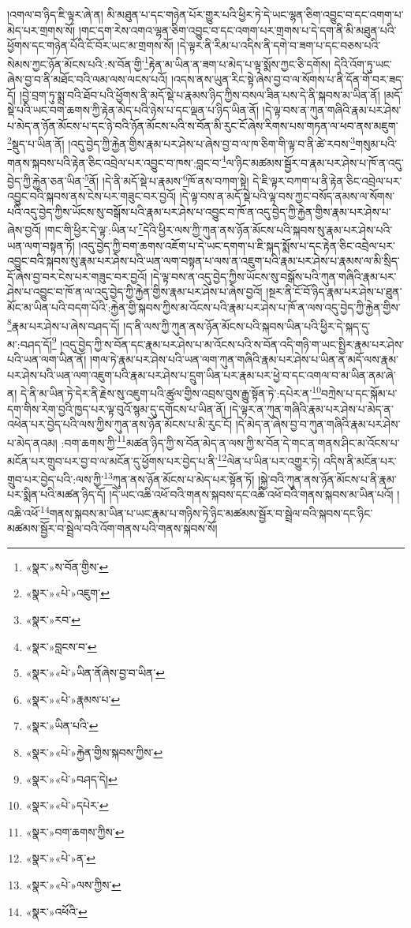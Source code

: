 །འགལ་བ་ཉིད་ཇི་ལྟར་ཞེ་ན། མི་མཐུན་པ་དང་གཉེན་པོར་གྱུར་པའི་ཕྱིར་ཏེ་དེ་ཡང་ལྷན་ཅིག་འབྱུང་བ་དང་འགག་པ་མེད་པར་གྲགས་སོ། །གང་དག་རེས་འགའ་ལྷན་ཅིག་འབྱུང་བ་དང་འགག་པར་གྲགས་པ་དེ་དག་ནི་མི་མཐུན་པའི་ཕྱོགས་དང་གཉེན་པོའི་ངོ་བོར་ཡང་མ་གྲགས་སོ། །དེ་ལྟར་ནི་རིམ་པ་འདིས་ནི་དགེ་བ་ཟག་པ་དང་བཅས་པའི་སེམས་ཀྱང་ཉོན་མོངས་པའི་:ས་བོན་གྱི་\footnote{«སྣར་»ས་བོན་གྱིས་}རྟེན་མ་ཡིན་ན་ཟག་པ་མེད་པ་ལྟ་སྨོས་ཀྱང་ཅི་དགོས། དེའི་འོག་ཏུ་ཡང་ཞེས་བྱ་བ་ནི་མཐོང་བའི་ལམ་ལས་ལངས་པའོ། །འདས་ནས་ཡུན་རིང་སྟེ་ཞེས་བྱ་བ་ལ་སོགས་པ་ནི་དོན་གོ་བར་ཟད་དོ། །བྱེ་བྲག་ཏུ་སྨྲ་བའི་ཐོབ་པའི་ཕྱོགས་ནི་མདོ་སྡེ་པ་རྣམས་ཉིད་ཀྱིས་བསལ་ཟིན་པས་དེ་ནི་སྐབས་མ་ཡིན་ནོ། །མདོ་སྡེ་པའི་ཡང་བག་ཆགས་ཀྱི་རྟེན་མེད་པའི་ཉེས་པ་དང་ལྡན་པ་ཉིད་ཡིན་ནོ། །དེ་ལྟ་བས་ན་ཀུན་གཞིའི་རྣམ་པར་ཤེས་པ་མེད་ན་ཉོན་མོངས་པ་དང་ཉེ་བའི་ཉོན་མོངས་པའི་ས་བོན་མི་རུང་ངོ་ཞེས་རིགས་པས་གཏན་ལ་ཕབ་ནས་མཇུག་\footnote{«སྣར་»«པེ་»འཇུག་}སྡུད་པ་ཡིན་ནོ། །འདུ་བྱེད་ཀྱི་རྐྱེན་གྱིས་རྣམ་པར་ཤེས་པ་ཞེས་བྱ་བ་ལ་ཁ་ཅིག་གི་ལྟ་བ་ནི་ཚེ་རབས་\footnote{«སྣར་»རབ་}གསུམ་པའི་གནས་སྐབས་པའི་རྟེན་ཅིང་འབྲེལ་པར་འབྱུང་བ་ཁས་:བླང་བ་\footnote{«སྣར་»བླངས་བ་}ལ་ཉིང་མཚམས་སྦྱོར་བ་རྣམ་པར་ཤེས་པ་ཁོ་ན་འདུ་བྱེད་ཀྱི་རྐྱེན་ཅན་ཡིན་\footnote{«སྣར་»«པེ་»ཡིན་ནོཞེས་བྱ་བ་ཡིན་}ནོ། །དེ་ནི་མདོ་སྡེ་པ་རྣམས་\footnote{«སྣར་»«པེ་»རྣམས་པ་}ཁོ་ནས་བཀག་སྟེ། དེ་ཇི་ལྟར་བཀག་པ་ནི་རྟེན་ཅིང་འབྲེལ་པར་འབྱུང་བའི་སྐབས་ནས་ངེས་པར་གཟུང་བར་བྱའོ། །དེ་ལྟ་བས་ན་མདོ་སྡེ་པའི་ལྟ་བས་ཀྱང་བསོད་ནམས་ལ་སོགས་པའི་འདུ་བྱེད་ཀྱིས་ཡོངས་སུ་བསྒོས་པའི་རྣམ་པར་ཤེས་པ་འབྱུང་བ་ཁོ་ན་འདུ་བྱེད་ཀྱི་རྐྱེན་གྱིས་རྣམ་པར་ཤེས་པ་ཞེས་བྱའོ། །གང་གི་ཕྱིར་དེ་ལྟ་:ཡིན་པ་\footnote{«སྣར་»ཡིན་པའི་}དེའི་ཕྱིར་ལས་ཀྱི་ཀུན་ནས་ཉོན་མོངས་པའི་སྐབས་སུ་རྣམ་པར་ཤེས་པའི་ཡན་ལག་བསྟན་ཏོ། །འདུ་བྱེད་ཀྱི་བག་ཆགས་འཇོག་པ་དེ་ཡང་དགག་པ་ཇི་སྐད་སྨོས་པ་དང་རྟེན་ཅིང་འབྲེལ་པར་འབྱུང་བའི་སྐབས་སུ་རྣམ་པར་ཤེས་པའི་ཡན་ལག་བསྟན་པ་ལས་ན་འཇུག་པའི་རྣམ་པར་ཤེས་པ་རྣམས་ལ་མི་སྲིད་དོ་ཞེས་བྱ་བར་ངེས་པར་གཟུང་བར་བྱའོ། །དེ་ལྟ་བས་ན་འདུ་བྱེད་ཀྱིས་ཡོངས་སུ་བསྒོས་པའི་ཀུན་གཞིའི་རྣམ་པར་ཤེས་པ་འབྱུང་བ་ཁོ་ན་ལ་འདུ་བྱེད་ཀྱི་རྐྱེན་གྱིས་རྣམ་པར་ཤེས་པ་ཞེས་བྱའོ། །སྔར་ནི་ངོ་བོ་ཉིད་རྣམ་པར་ཤེས་པ་ཐུན་མོང་མ་ཡིན་པའི་བདག་པོའི་:རྐྱེན་གྱི་སྐབས་ཀྱིས་མ་འོངས་པའི་རྣམ་པར་ཤེས་པ་ཁོ་ན་ལས་འདུ་བྱེད་ཀྱི་རྐྱེན་གྱིས་\footnote{«སྣར་»«པེ་»རྐྱེན་གྱིས་སྐབས་ཀྱིས་}རྣམ་པར་ཤེས་པ་ཞེས་བཤད་དོ། །ད་ནི་ལས་ཀྱི་ཀུན་ནས་ཉོན་མོངས་པའི་སྐབས་ཡིན་པའི་ཕྱིར་དེ་སྐད་དུ་མ་:བཤད་དོ།\footnote{«སྣར་»«པེ་»བཤད་དེ།} །འདུ་བྱེད་ཀྱི་ས་བོན་དང་རྣམ་པར་ཤེས་པ་མ་འོངས་པའི་ས་བོན་འདི་གཉི་ག་ཡང་སྤྱིར་རྣམ་པར་ཤེས་པའི་ཡན་ལག་ཡིན་ནོ། །གལ་ཏེ་རྣམ་པར་ཤེས་པའི་ཡན་ལག་ཀུན་གཞིའི་རྣམ་པར་ཤེས་པ་ཡིན་ན་མདོ་ལས་རྣམ་པར་ཤེས་པའི་ཡན་ལག་འཇུག་པའི་རྣམ་པར་ཤེས་པ་དྲུག་ཡིན་པར་རྣམ་པར་ཕྱེ་བ་དང་འགལ་བ་མ་ཡིན་ནམ་ཞེ་ན། དེ་ནི་མ་ཡིན་ཏེ་དེར་ནི་རྗེས་སུ་འཇུག་པའི་ཚུལ་གྱིས་འབྲས་བུས་རྒྱུ་སྟོན་ཏེ་:དཔེར་ན་\footnote{«སྣར་»«པེ་»དཔེར་}བཀྲེས་པ་དང་སྐོམ་པ་དག་གིས་རེག་བྱའི་ཁྱད་པར་ལྟ་བུའོ་སྙམ་དུ་དགོངས་པ་ཡིན་ནོ། །དེ་ལྟར་ན་ཀུན་གཞིའི་རྣམ་པར་ཤེས་པ་མེད་ན་འཕེན་པར་བྱེད་པའི་ལས་ཀྱིས་ཀུན་ནས་ཉོན་མོངས་པ་མི་རུང་ངོ། །དེ་མེད་ན་ཞེས་བྱ་བ་ཀུན་གཞིའི་རྣམ་པར་ཤེས་པ་མེད་ནའམ། :བག་ཆགས་ཀྱི་\footnote{«སྣར་»བག་ཆགས་ཀྱིས་}མཚན་ཉིད་ཀྱི་ས་བོན་མེད་ན་ལས་ཀྱི་ས་བོན་དེ་གང་ན་གནས་ཤིང་མ་འོངས་པ་མངོན་པར་གྲུབ་པར་བྱ་བ་ལ་མངོན་དུ་ཕྱོགས་པར་བྱེད་པ་ནི་\footnote{«སྣར་»«པེ་»ན་}ལེན་པ་ཡིན་པར་འགྱུར་ཏེ། འདིས་ནི་མངོན་པར་གྲུབ་པར་བྱེད་པའི་:ལས་ཀྱི་\footnote{«སྣར་»«པེ་»ལས་ཀྱིས་}ཀུན་ནས་ཉོན་མོངས་པ་མེད་པར་སྟོན་ཏོ། །སྐྱེ་བའི་ཀུན་ནས་ཉོན་མོངས་པ་ནི་རྣམ་པར་སྨིན་པའི་མཚན་ཉིད་དོ། །དེ་ཡང་འཆི་འཕོ་བའི་གནས་སྐབས་དང་འཆི་འཕོ་བའི་གནས་སྐབས་མ་ཡིན་པའོ། །འཆི་འཕོ་\footnote{«སྣར་»འཕོའི་}གནས་སྐབས་མ་ཡིན་པ་ཡང་རྣམ་པ་གཉིས་ཏེ་ཉིང་མཚམས་སྦྱོར་བ་སྦྲེལ་བའི་སྐབས་དང་ཉིང་མཚམས་སྦྱོར་བ་སྦྲེལ་བའི་འོག་གནས་པའི་གནས་སྐབས་སོ། 